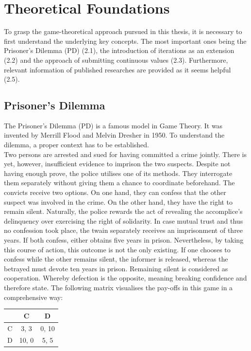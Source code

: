 \documentclass[11pt]{article}
\begin{document}
\section{Theoretical Foundations}

To grasp the game-theoretical approach pursued in this thesis, it is necessary to first understand the underlying key concepts. 
The most important ones being the Prisoner's Dilemma (PD) (2.1), the introduction of iterations as an extension (2.2) and the approach of submitting continuous values (2.3).
Furthermore, relevant information of published researches are provided as it seems helpful (2.5).

\subsection{Prisoner's Dilemma}
		
The Prisoner's Dilemma (PD) is a famous model in Game Theory. 
It was invented by Merrill Flood and Melvin Dresher in 1950. 
To understand the dilemma, a proper context has to be established.\\
Two persons are arrested and sued for having committed a crime jointly.
There is yet, however, insufficient evidence to imprison the two suspects.
Despite not having enough prove, the police utilises one of its methods.
They interrogate them separately without giving them a chance to coordinate beforehand.
The convicts receive two options.
On one hand, they can confess that the other suspect was involved in the crime. 
On the other hand, they have the right to remain silent.
Naturally, the police rewards the act of revealing the accomplice's delinquency over exercising the right of solidarity.
In case mutual trust and thus no confession took place, the twain separately receives an imprisonment of three years.
If both confess, either obtains five years in prison.
Nevertheless, by taking this course of action, this outcome is not the only existing.
If one chooses to confess while the other remains silent, the informer is released, whereas the betrayed must devote ten years in prison.
Remaining silent is considered as cooperation.
Whereby defection is the opposite, meaning breaking confidence and therefore state.
The following matrix visualises the pay-offs in this game in a comprehensive way:

\begin{center}
\begin{tabular}{ c|c|c }
   & C & D \\ 
   \hline
 C & 3, 3 & 0, 10\\  
   \hline
 D & 10, 0 & 5, 5
\end{tabular}
\end{center}
\end{document}
